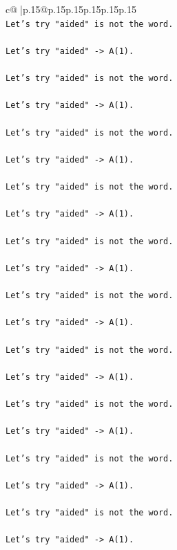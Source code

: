 \documentclass{article}
\begin{document}
{\begin{supertabular}{c@{$\;$}|p{.15\linewidth}@{}p{.15\linewidth}p{.15\linewidth}p{.15\linewidth}p{.15\linewidth}p{.15\linewidth}}
{{{\\ 
\texttt{Let's try "aided" is not the word.} \\
\\ 
\texttt{Let's try "aided" {-}> A(1).} \\
\\ 
\texttt{Let's try "aided" is not the word.} \\
\\ 
\texttt{Let's try "aided" {-}> A(1).} \\
\\ 
\texttt{Let's try "aided" is not the word.} \\
\\ 
\texttt{Let's try "aided" {-}> A(1).} \\
\\ 
\texttt{Let's try "aided" is not the word.} \\
\\ 
\texttt{Let's try "aided" {-}> A(1).} \\
\\ 
\texttt{Let's try "aided" is not the word.} \\
\\ 
\texttt{Let's try "aided" {-}> A(1).} \\
\\ 
\texttt{Let's try "aided" is not the word.} \\
\\ 
\texttt{Let's try "aided" {-}> A(1).} \\
\\ 
\texttt{Let's try "aided" is not the word.} \\
\\ 
\texttt{Let's try "aided" {-}> A(1).} \\
\\ 
\texttt{Let's try "aided" is not the word.} \\
\\ 
\texttt{Let's try "aided" {-}> A(1).} \\
\\ 
\texttt{Let's try "aided" is not the word.} \\
\\ 
\texttt{Let's try "aided" {-}> A(1).} \\
\\ 
\texttt{Let's try "aided" is not the word.} \\
\\ 
\texttt{Let's try "aided" {-}> A(1).} \\
\\ 
}}}
\end{supertabular}}
\end{document}
